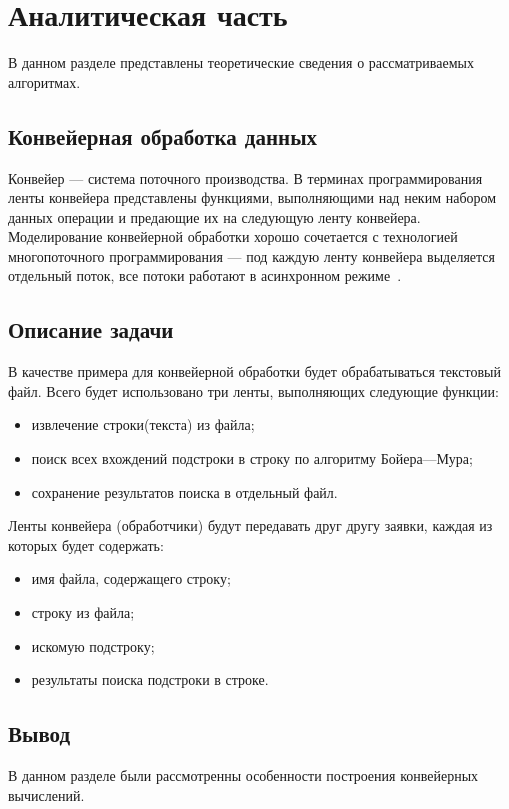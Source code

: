 \chapter{Аналитическая часть}

В данном разделе представлены теоретические сведения о рассматриваемых алгоритмах.

\section{Конвейерная обработка данных}

Конвейер --- система поточного производства.
В терминах программирования ленты конвейера представлены функциями, выполняющими над неким набором данных операции и предающие их на следующую ленту конвейера.
Моделирование конвейерной обработки хорошо сочетается с технологией многопоточного программирования --- под каждую ленту конвейера выделяется отдельный поток, все потоки работают в асинхронном режиме~\cite{conveyer}.

\section{Описание задачи}

В качестве примера для конвейерной обработки будет обрабатываться
текстовый файл.
Всего будет использовано три ленты, выполняющих следующие функции:
\begin{itemize}
	\item извлечение строки(текста) из файла;
	\item поиск всех вхождений подстроки в строку по алгоритму Бойера---Мура;
	\item сохранение результатов поиска в отдельный файл.
\end{itemize}

Ленты конвейера (обработчики) будут передавать друг другу заявки, каждая из которых будет содержать:
\begin{itemize}
	\item имя файла, содержащего строку;
	\item строку из файла;
	\item искомую подстроку;
	\item результаты поиска подстроки в строке.
\end{itemize}

\section*{Вывод}

В данном разделе были рассмотренны особенности построения конвейерных вычислений.
